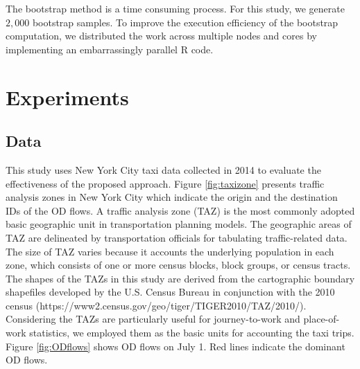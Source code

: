 \documentclass[a4paper,UKenglish]{lipics-v2018}
\providecommand{\DIFadd}[1]{{\protect\color{blue}\uwave{#1}}} %
\providecommand{\DIFaddbegin}{} %
\providecommand{\DIFaddend}{} %
\begin{document}
The bootstrap method is a time consuming process.
For this study, we generate $2,000$ bootstrap samples.
To improve the execution efficiency of the bootstrap computation, we distributed the work across multiple \DIFaddbegin \DIFadd{computing }\DIFaddend nodes and cores by implementing an embarrassingly parallel R code. 


\section{Experiments}
\label{sec:experiments}

\subsection{Data}
This study uses New York City taxi data collected in 2014 to evaluate the effectiveness of the proposed approach.
Figure \ref{fig:taxizone} presents traffic analysis zones in New York City which indicate the origin and the destination IDs of the OD flows. 
A traffic analysis zone (TAZ) is the most commonly adopted basic geographic unit in transportation planning models.
The geographic areas of TAZ are delineated by transportation officials for tabulating traffic-related data.
The size of TAZ varies because it accounts the underlying population in each zone, which consists of one or more census blocks, block groups, or census tracts.
The shapes of the TAZs in this study are derived from the cartographic boundary shapefiles developed by the U.S. Census Bureau in conjunction with the 2010 census (https://www2.census.gov/geo/tiger/TIGER2010/TAZ/2010/).
Considering the TAZs are particularly useful for journey-to-work and place-of-work statistics, we employed them as the basic units for accounting the taxi trips. 
Figure \ref{fig:ODflows} shows OD flows on July 1.
Red lines indicate the dominant OD flows.
\end{document}
